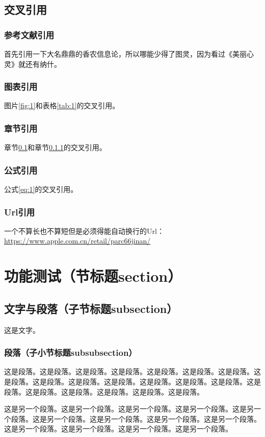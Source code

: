 \begin{ujnbody}
    \subsection{交叉引用}\label{sec:1}
    \subsubsection{参考文献引用}\label{sec:2}
    首先引用一下大名鼎鼎的香农信息论\cite{shannon1948mathematical}，所以哪能少得了图灵\cite{turing2009computing}，因为看过《美丽心灵》就还有纳什\cite{nash1996non}。
    \subsubsection{图表引用}
    图片\ref{fig:1}和表格\ref{tab:1}的交叉引用。
    \subsubsection{章节引用}
    章节\ref{sec:1}和章节\ref{sec:2}的交叉引用。
    \subsubsection{公式引用}
    公式\ref{eq:1}的交叉引用。
    \subsubsection{Url引用}
    一个不算长也不算短但是必须得能自动换行的Url：\url{https://www.apple.com.cn/retail/parc66jinan/}
    \section{功能测试（节标题section）}
    \subsection{文字与段落（子节标题subsection）}
    这是文字。
    \subsubsection{段落（子小节标题subsubsection）}
    这是段落。这是段落。这是段落。这是段落。这是段落。这是段落。这是段落。这是段落。这是段落。这是段落。这是段落。这是段落。这是段落。这是段落。这是段落。这是段落。这是段落。这是段落。这是段落。这是段落。

    这是另一个段落。这是另一个段落。这是另一个段落。这是另一个段落。这是另一个段落。这是另一个段落。这是另一个段落。这是另一个段落。这是另一个段落。这是另一个段落。这是另一个段落。这是另一个段落。这是另一个段落。

\end{ujnbody}
